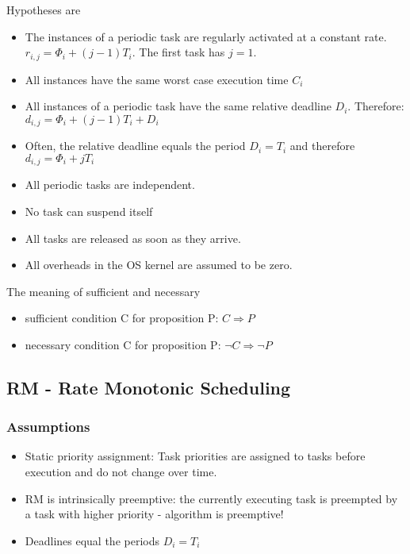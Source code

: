 \begin{tnote}
Hypotheses are
\begin{itemize}[noitemsep]
\item The instances of a periodic task are 
regularly activated at a constant rate. ${r_{i, j} = \Phi_i + (j-1)T_i}$. The first task has $j = 1$.
\item All instances have the 
same worst case execution time $C_i$
\item All instances of a periodic task have the 
same relative deadline $D_i$. Therefore: ${ d_{i, j} = \Phi_i + (j-1)T_i +D_i}$
\item Often, the relative deadline equals the period $D_i = T_i$
and therefore $d_{i, j} = \Phi_i + jT_i$
\item All periodic tasks are independent.
\item No task can suspend itself
\item All tasks are released as soon as they arrive.
\item All overheads in the OS kernel are assumed to be zero.
\end{itemize}

The meaning of sufficient and necessary
\begin{itemize}[noitemsep]
\item sufficient condition C for proposition P: $C \Rightarrow P$
\item necessary condition C for proposition P: $\lnot C \Rightarrow \lnot P$
\end{itemize}

\end{tnote}


\subsection{RM - Rate Monotonic Scheduling}

\subsubsection{Assumptions}
\begin{itemize}[noitemsep]
\item Static priority assignment: Task priorities are assigned to tasks before execution and do 
not change over time.
\item RM is intrinsically preemptive: the currently executing task is 
preempted by a task with higher priority - algorithm is preemptive!
\item Deadlines
equal the periods $D_i = T_i$
\end{itemize}

